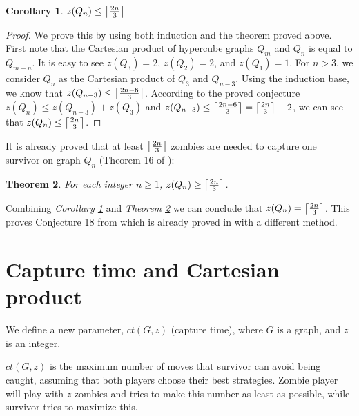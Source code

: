 \documentclass[1p]{elsarticle}
\DeclarePairedDelimiter\ceil{\lceil}{\rceil} \DeclarePairedDelimiter\floor{\lfloor}{\rfloor}
\newtheorem{theorem}{Theorem}
\newtheorem{corollary}[theorem]{Corollary}
\begin{document}
\begin{corollary}
	\label{C3}
	$z(Q_{n}) \leq \ceil*{\frac{2n}{3}}$
\end{corollary}
\begin{proof}
	We prove this by using both induction and the theorem proved above. First note that the Cartesian product of
	hypercube graphs $Q_{m}$ and $Q_{n}$ is equal to $Q_{m+n}$. It is easy to see $z(Q_3) = 2$, $z(Q_2) = 2$, and
	$z(Q_1) = 1$. For $n > 3$, we consider $Q_n$ as the Cartesian product of $Q_3$ and $Q_{n-3}$. Using the induction
	base, we know that $z(Q_{n-3}) \leq \ceil*{\frac{2n - 6}{3}}$. According to the proved conjecture $z(Q_n) \leq
	z(Q_{n-3}) + z(Q_3)$ and $z(Q_{n-3}) \leq \ceil*{\frac{2n - 6}{3}} = \ceil*{\frac{2n}{3}} - 2$, we can see that
	$z(Q_n) \leq \ceil*{\frac{2n}{3}}$.
\end{proof}

It is already proved that at least $\ceil*{\frac{2n}{3}}$ zombies are needed to capture one survivor on graph $Q_n$
(Theorem 16 of \cite{Fitz16}):

\begin{theorem}
	\label{T4}
	For each integer $n \geq 1$, $z(Q_n) \geq \ceil*{\frac{2n}{3}} $.
\end{theorem}

Combining {\it Corollary \ref{C3}} and {\it Theorem \ref{T4}} we can conclude that $z(Q_n) = \ceil*{\frac{2n}{3}}$.
This proves Conjecture 18 from \cite{Fitz16} which is already proved in \cite{Offner19} with a different method. 
	

\section{Capture time and Cartesian product}\label{capturetime}
	We define a new parameter, $ct(G,z)$ (capture time), where $G$ is a graph, and $z$ is an integer.
	
	$ct(G,z)$ is the maximum number of moves that survivor can avoid being caught, assuming that both players choose their best
	strategies. Zombie player will play with $z$ zombies and tries to make this number as least as possible, while
	survivor tries to maximize this.
\end{document}
